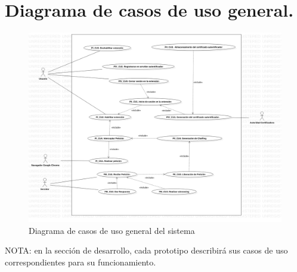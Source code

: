 \documentclass[12pt, a4paper, titlepage]{report}
\begin{document}
	    \section{Diagrama de casos de uso general.}
	         \begin{figure}[H]
        		\begin{center}
        		\includegraphics[width=13cm]{./imagenes/Analisis/UCD_General.png}
        		\caption{Diagrama de casos de uso general del sistema}
	            \end{center}
	        \end{figure}   
	        
	        NOTA: en la sección de desarrollo, cada prototipo describirá sus casos de uso correspondientes para su funcionamiento.
	        
		\newpage
\end{document}
